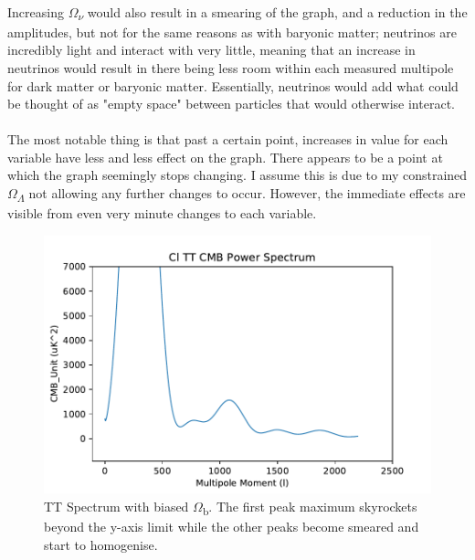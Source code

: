 \documentclass[twoside, fontsize=12pt,
     bibliography=totoc, %
     listof=totoc, %
     index=totoc, %
     onehalfspacing %
]{_MScDiss2017_cls}
\begin{document}
\paragraph{}
Increasing $\Omega$\textsubscript{$\nu$} would also result in a smearing of the graph, and a reduction in the amplitudes, but not for the same reasons as with baryonic matter; neutrinos are incredibly light and interact with very little, meaning that an increase in neutrinos would result in there being less room within each measured multipole for dark  matter or baryonic matter. Essentially, neutrinos would add what could be thought of as "empty space" between particles that would otherwise interact.

\paragraph{}

The most notable thing is that past a certain point, increases in value for each variable have less and less effect on the graph. There appears to be a point at which the graph seemingly stops changing. I assume this is due to my constrained $\Omega$\textsubscript{$\Lambda$} not allowing any further changes to occur. However, the immediate effects are visible from even very minute changes to each variable.

\begin{figure}[t]
	\begin{center}
	\includegraphics{3Cl-TT-vs-l}
	\caption{TT Spectrum with biased $\Omega$\textsubscript{b}. The first peak maximum skyrockets beyond the y-axis limit while the other peaks become smeared and start to homogenise.}
	\label{fig:bbias}
	\end{center}
\end{figure}
\end{document}
